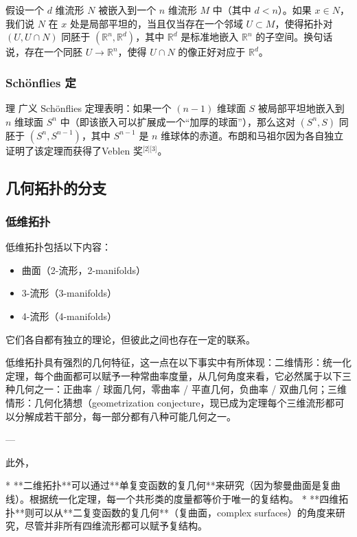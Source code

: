 假设一个 $d$ 维流形 $N$ 被嵌入到一个 $n$ 维流形 $M$ 中（其中 $d < n$）。如果 $x \in N$，我们说 $N$ 在 $x$ 处是局部平坦的，当且仅当存在一个邻域 $U \subset M$，使得拓扑对 $(U, U \cap N)$ 同胚于 $(\mathbb{R}^n, \mathbb{R}^d)$，其中 $\mathbb{R}^d$ 是标准地嵌入 $\mathbb{R}^n$ 的子空间。换句话说，存在一个同胚 $U \to \mathbb{R}^n$，使得 $U \cap N$ 的像正好对应于 $\mathbb{R}^d$。
\subsubsection{Schönflies 定}理
广义 Schönflies 定理表明：如果一个 $(n-1)$ 维球面 $S$ 被局部平坦地嵌入到 $n$ 维球面 $S^n$ 中（即该嵌入可以扩展成一个“加厚的球面”），那么这对 $(S^n, S)$ 同胚于 $(S^n, S^{n-1})$，其中 $S^{n-1}$ 是 $n$ 维球体的赤道。布朗和马祖尔因为各自独立证明了该定理而获得了Veblen 奖\(^\text{[2][3]}\)。
\subsection{几何拓扑的分支}
\subsubsection{低维拓扑}
低维拓扑包括以下内容：
\begin{itemize}
\item 曲面（2-流形，2-manifolds）
\item 3-流形（3-manifolds）
\item 4-流形（4-manifolds）
\end{itemize}
它们各自都有独立的理论，但彼此之间也存在一定的联系。


低维拓扑具有强烈的几何特征，这一点在以下事实中有所体现：二维情形：统一化定理，每个曲面都可以赋予一种常曲率度量，从几何角度来看，它必然属于以下三种几何之一：正曲率 / 球面几何，零曲率 / 平直几何，负曲率 / 双曲几何；三维情形：几何化猜想（geometrization conjecture，现已成为定理每个三维流形都可以分解成若干部分，每一部分都有八种可能几何之一。

---

此外，

* **二维拓扑**可以通过**单复变函数的复几何**来研究（因为黎曼曲面是复曲线）。根据统一化定理，每一个共形类的度量都等价于唯一的复结构。
* **四维拓扑**则可以从**二复变函数的复几何**（复曲面，complex surfaces）的角度来研究，尽管并非所有四维流形都可以赋予复结构。
